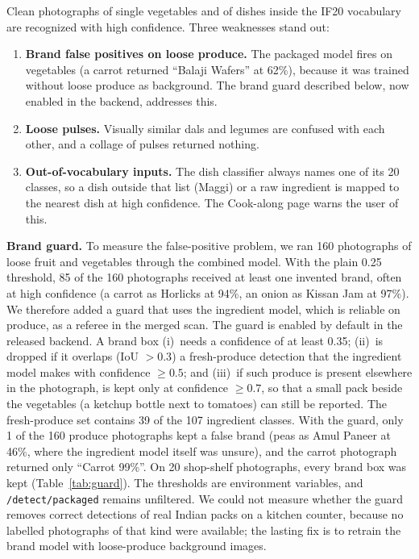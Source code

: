 \documentclass[journal]{IEEEtran}
\begin{document}
Clean photographs of single vegetables and of dishes inside the IF20
vocabulary are recognized with high confidence. Three weaknesses
stand out:
\begin{enumerate}
  \item \textbf{Brand false positives on loose produce.} The
        packaged model fires on vegetables (a carrot returned
        ``Balaji Wafers'' at 62\%), because it was trained without
        loose produce as background. The brand guard described
        below, now enabled in the backend, addresses this.
  \item \textbf{Loose pulses.} Visually similar dals and legumes are
        confused with each other, and a collage of pulses returned
        nothing.
  \item \textbf{Out-of-vocabulary inputs.} The dish classifier always
        names one of its 20 classes, so a dish outside that list
        (Maggi) or a raw ingredient is mapped to the nearest dish at
        high confidence. The Cook-along page warns the user of this.
\end{enumerate}
\textbf{Brand guard.} To measure the false-positive problem, we ran
160 photographs of loose fruit and vegetables through the combined
model. With the plain 0.25 threshold, 85 of the 160 photographs
received at least one invented brand, often at high confidence (a
carrot as Horlicks at 94\%, an onion as Kissan Jam at 97\%). We
therefore added a guard that uses the ingredient model, which is
reliable on produce, as a referee in the merged scan. The guard is
enabled by default in the released backend. A brand box (i)~needs a confidence of
at least 0.35; (ii)~is dropped if it overlaps (IoU $>0.3$) a
fresh-produce detection that the ingredient model makes with
confidence $\geq 0.5$; and (iii)~if such produce is present elsewhere
in the photograph, is kept only at confidence $\geq 0.7$, so that a
small pack beside the vegetables (a ketchup bottle next to tomatoes)
can still be reported. The fresh-produce set contains 39 of the 107
ingredient classes. With the guard, only 1 of the 160 produce
photographs kept a false brand (peas as Amul Paneer at 46\%, where
the ingredient model itself was unsure), and the carrot photograph
returned only ``Carrot 99\%''. On 20 shop-shelf photographs, every
brand box was kept (Table~\ref{tab:guard}). The thresholds are
environment variables, and \texttt{/detect/packaged} remains
unfiltered. We could not measure whether the guard removes correct
detections of real Indian packs on a kitchen counter, because no
labelled photographs of that kind were available; the lasting fix is
to retrain the brand model with loose-produce background images.
\end{document}
